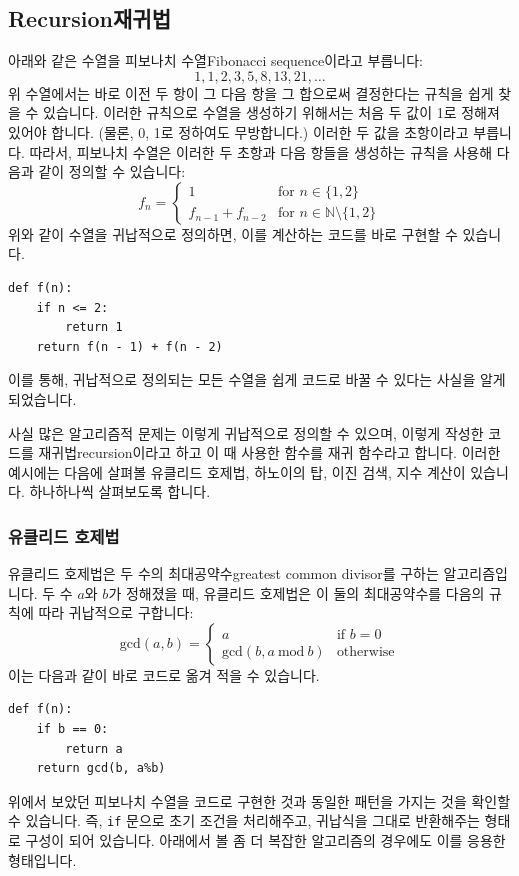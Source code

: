 \documentclass[../main.tex]{subfiles}
\begin{document}
\subsection{Recursion재귀법}
아래와 같은 수열을 피보나치 수열Fibonacci sequence이라고 부릅니다:
\[
1, 1, 2, 3, 5, 8, 13, 21, \dots
\]
위 수열에서는 바로 이전 두 항이 그 다음 항을 그 합으로써 결정한다는 규칙을 쉽게 찾을 수 있습니다.
이러한 규칙으로 수열을 생성하기 위해서는 처음 두 값이 1로 정해져 있어야 합니다.
(물론, 0, 1로 정하여도 무방합니다.)
이러한 두 값을 초항이라고 부릅니다.
따라서, 피보나치 수열은 이러한 두 초항과 다음 항들을 생성하는 규칙을 사용해 다음과 같이 정의할 수 있습니다:
\[
f_n = \begin{cases}
1 & \text{for $n \in \{1, 2\}$}\\
f_{n - 1} + f_{n - 2} & \text{for $n \in \mathbb{N} \setminus \{1, 2\}$}
\end{cases}
\]
위와 같이 수열을 귀납적으로 정의하면, 이를 계산하는 코드를 바로 구현할 수 있습니다.
\begin{verbatim}
def f(n):
    if n <= 2:
        return 1
    return f(n - 1) + f(n - 2)
\end{verbatim}
이를 통해, 귀납적으로 정의되는 모든 수열을 쉽게 코드로 바꿀 수 있다는 사실을 알게 되었습니다.

사실 많은 알고리즘적 문제는 이렇게 귀납적으로 정의할 수 있으며, 이렇게 작성한 코드를 재귀법recursion이라고 하고 이 때 사용한 함수를 재귀 함수라고 합니다.
이러한 예시에는 다음에 살펴볼 유클리드 호제법, 하노이의 탑, 이진 검색, 지수 계산이 있습니다.
하나하나씩 살펴보도록 합니다.

\subsubsection{유클리드 호제법}
유클리드 호제법은 두 수의 최대공약수greatest common divisor를 구하는 알고리즘입니다.
두 수 $a$와 $b$가 정해졌을 때, 유클리드 호제법은 이 둘의 최대공약수를 다음의 규칙에 따라 귀납적으로 구합니다:
\[
\mathrm{gcd}(a, b) = \begin{cases}
a & \text{if }b = 0\\
\mathrm{gcd}(b, a\ \mathrm{mod}\ b) & \text{otherwise}
\end{cases}
\]
이는 다음과 같이 바로 코드로 옮겨 적을 수 있습니다.
\begin{verbatim}
def f(n):
    if b == 0:
        return a
    return gcd(b, a%b)
\end{verbatim}
위에서 보았던 피보나치 수열을 코드로 구현한 것과 동일한 패턴을 가지는 것을 확인할 수 있습니다.
즉, \texttt{if} 문으로 초기 조건을 처리해주고, 귀납식을 그대로 반환해주는 형태로 구성이 되어 있습니다.
아래에서 볼 좀 더 복잡한 알고리즘의 경우에도 이를 응용한 형태입니다.
\end{document}
